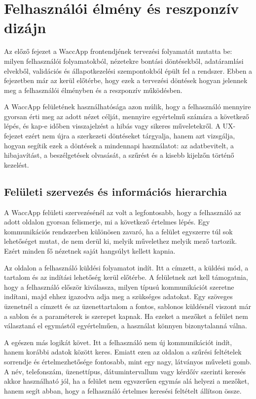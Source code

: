 \chapter{Felhasználói élmény és reszponzív dizájn}

Az előző fejezet a WaccApp frontendjének tervezési folyamatát mutatta be: milyen felhasználói folyamatokból, nézetekre bontási döntésekből, adatáramlási elvekből, validációs és állapotkezelési szempontokból épült fel a rendszer. Ebben a fejezetben már az kerül előtérbe, hogy ezek a tervezési döntések hogyan jelennek meg a felhasználói élményben és a reszponzív működésben.

A WaccApp felületének használhatósága azon múlik, hogy a felhasználó mennyire gyorsan érti meg az adott nézet célját, mennyire egyértelmű számára a következő lépés, és kap-e időben visszajelzést a hibás vagy sikeres műveletekről. A UX-fejezet ezért nem újra a szerkezeti döntéseket tárgyalja, hanem azt vizsgálja, hogyan segítik ezek a döntések a mindennapi használatot: az adatbevitelt, a hibajavítást, a beszélgetések olvasását, a szűrést és a kisebb kijelzőn történő kezelést.

\section{Felületi szervezés és információs hierarchia}

A WaccApp felületi szervezésénél az volt a legfontosabb, hogy a felhasználó az adott oldalon gyorsan felismerje, mi a következő értelmes lépés. Egy kommunikációs rendszerben különösen zavaró, ha a felület egyszerre túl sok lehetőséget mutat, de nem derül ki, melyik művelethez melyik mező tartozik. Ezért minden fő nézetnek saját hangsúlyt kellett kapnia.

Az  oldalon a felhasználó küldési folyamatot indít. Itt a címzett, a küldési mód, a tartalom és az indítási lehetőség kerül előtérbe. A felületnek azt kell támogatnia, hogy a felhasználó először kiválassza, milyen típusú kommunikációt szeretne indítani, majd ehhez igazodva adja meg a szükséges adatokat. Egy szöveges üzenetnél a címzett és az üzenettartalom a fontos, sablonos küldésnél viszont már a sablon és a paraméterek is szerepet kapnak. Ha ezeket a mezőket a felület nem választaná el egymástól egyértelműen, a használat könnyen bizonytalanná válna.

A  egészen más logikát követ. Itt a felhasználó nem új kommunikációt indít, hanem korábbi adatok között keres. Emiatt ezen az oldalon a szűrési feltételek sorrendje és értelmezhetősége fontosabb, mint egy nagy, látványos műveleti gomb. A név, telefonszám, üzenettípus, dátumintervallum vagy kérdőív szerinti keresés akkor használható jól, ha a felület nem egyszerűen egymás alá helyezi a mezőket, hanem segít abban, hogy a felhasználó értelmes keresési feltételt állítson össze.

